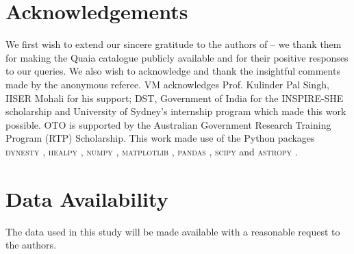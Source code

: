 \documentclass[fleqn,usenatbib]{mnras}
\begin{document}
        

\section*{Acknowledgements}
    We first wish to extend our sincere gratitude to the authors of \citet{storeyfisher2023quaia} -- we thank them for making the Quaia catalogue publicly available and for their positive responses to our queries.
    We also wish to acknowledge and thank the insightful comments made by the anonymous referee.
    VM acknowledges Prof. Kulinder Pal Singh, IISER Mohali for his support; DST, Government of India for the INSPIRE-SHE scholarship and University of Sydney's internship program which made this work possible.
    OTO is supported by the Australian Government Research Training Program (RTP) Scholarship.
    This work made use of the Python packages \textsc{dynesty} \citep{skilling2004, skilling2006, dynesty-v2.1.2}, \textsc{healpy} \citep{Gorski2005,Zonca2019}, \textsc{numpy} \citep{harris2020}, \textsc{matplotlib} \citep{hunter2007}, \textsc{pandas} \citep{mckinney2010,reback2020}, \textsc{scipy} \citep{scipy2020} and \textsc{astropy} \citep{astropy2022}.

\section*{Data Availability}

The data used in this study will be made available with a reasonable request to the authors.


\end{document}
